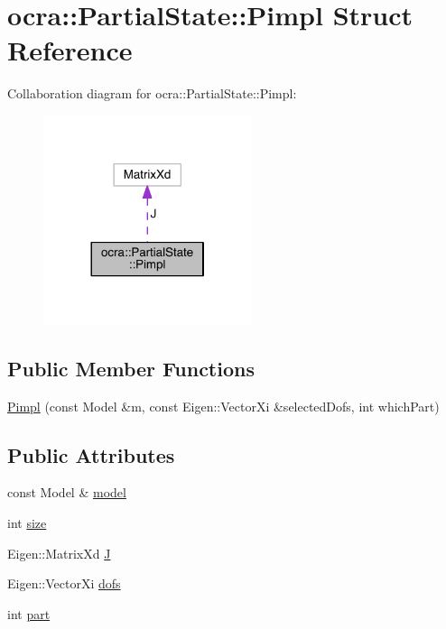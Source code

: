 \hypertarget{structocra_1_1PartialState_1_1Pimpl}{}\section{ocra\+:\+:Partial\+State\+:\+:Pimpl Struct Reference}
\label{structocra_1_1PartialState_1_1Pimpl}


Collaboration diagram for ocra\+:\+:Partial\+State\+:\+:Pimpl\+:\nopagebreak
\begin{figure}[H]
\begin{center}
\leavevmode
\includegraphics[width=173pt]{dd/df3/structocra_1_1PartialState_1_1Pimpl__coll__graph}
\end{center}
\end{figure}
\subsection*{Public Member Functions}
\begin{DoxyCompactItemize}
\item 
\hyperlink{structocra_1_1PartialState_1_1Pimpl_a4f12abe2e984af1d293d847dc3456724}{Pimpl} (const Model \&m, const Eigen\+::\+Vector\+Xi \&selected\+Dofs, int which\+Part)
\end{DoxyCompactItemize}
\subsection*{Public Attributes}
\begin{DoxyCompactItemize}
\item 
const Model \& \hyperlink{structocra_1_1PartialState_1_1Pimpl_a45e5572b9e9cbe6ac2d9ba4107a58bd6}{model}
\item 
int \hyperlink{structocra_1_1PartialState_1_1Pimpl_ac60f12a932c9bac309b2c1794de57a9c}{size}
\item 
Eigen\+::\+Matrix\+Xd \hyperlink{structocra_1_1PartialState_1_1Pimpl_a7c31cf81faa6abbbe780b9f143094418}{J}
\item 
Eigen\+::\+Vector\+Xi \hyperlink{structocra_1_1PartialState_1_1Pimpl_a206c2d1097d24706e5bf2d3a9b0862a8}{dofs}
\item 
int \hyperlink{structocra_1_1PartialState_1_1Pimpl_a605a55abed1d170fa6911088fefa7337}{part}
\end{DoxyCompactItemize}


